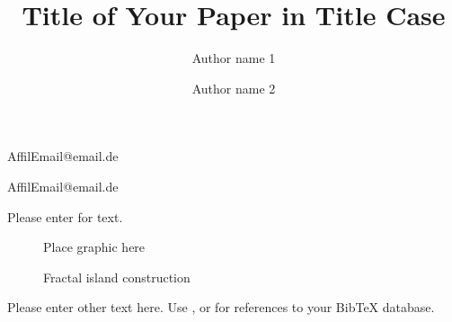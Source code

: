 \documentclass[a4paper,11pt]{article}
\begin{document}
\title{Title of Your Paper in Title Case}
\author{Author name 1}{Affil}{Email@email.de}
\author{Author name 2}{Affil}{Email@email.de}
\maketitle


Please enter for text.
\begin{figure}
Place graphic here
\caption{Fractal island construction}
\label{fig:fractal_island_construction}
\end{figure}

Please enter other text here. Use \parencite{key}, \cite{key} or \textcite{key} for references to your BibTeX database.

\printbibliography
\end{document}
